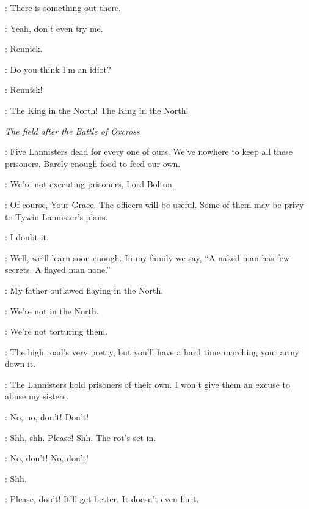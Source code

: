 
\LANNISTERGUARD: There is something out there. 

\RENNICK: Yeah, don't even try me. 

\LANNISTERGUARD: Rennick. 

\RENNICK: Do you think I'm an idiot? 

\LANNISTERGUARD: Rennick! 


\STARKARMY: The King in the North! The King in the North! 


\scene

\textit{The field after the Battle of Oxcross} 


\ROOSE: Five Lannisters dead for every one of ours. We've nowhere to keep all these prisoners. Barely enough food to feed our own. 

\ROBB: We're not executing prisoners, Lord Bolton. 

\ROOSE: Of course, Your Grace. The officers will be useful. Some of them may be privy to Tywin Lannister's plans. 

\ROBB: I doubt it. 

\ROOSE: Well, we'll learn soon enough. In my family we say, ``A naked man has few secrets. A flayed man none.'' 

\ROBB: My father outlawed flaying in the North. 

\ROOSE: We're not in the North. 

\ROBB: We're not torturing them. 

\ROOSE: The high road's very pretty, but you'll have a hard time marching your army down it. 

\ROBB: The Lannisters hold prisoners of their own. I won't give them an excuse to abuse my sisters. 


\WOUNDEDLANNISTER: No, no, don't! Don't! 

\TALISA: Shh, shh. Please! Shh. The rot's set in. 

\WOUNDEDLANNISTER: No, don't! No, don't! 

\TALISA: Shh. 

\WOUNDEDLANNISTER: Please, don't! It'll get better. It doesn't even hurt. 

